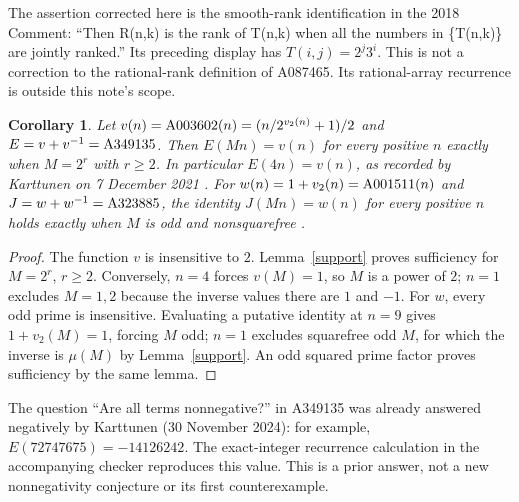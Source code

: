\documentclass[11pt]{article}
\newtheorem{corollary}[theorem]{Corollary}
\newcommand{\A}[1]{\textnormal{A#1}}
\begin{document}
The assertion corrected here is the smooth-rank identification in the
2018 Comment: ``Then R(n,k) is the rank of T(n,k) when all the numbers
in \{T(n,k)\} are jointly ranked.'' Its preceding display has
$T(i,j)=2^j3^i$. This is not a correction to the rational-rank definition of A087465.
Its rational-array recurrence is outside this note's scope.

\begin{corollary}\label{binary}
Let $v(n)=\A{003602}(n)=(n/2^{v_2(n)}+1)/2$ and
$E=v+v^{-1}=\A{349135}$. Then $E(Mn)=v(n)$ for every positive $n$
exactly when $M=2^r$ with $r\geq2$. In particular $E(4n)=v(n)$,
as recorded by Karttunen on 7 December 2021 \cite{binarysum}.
For $w(n)=1+v_2(n)=\A{001511}(n)$ and
$J=w+w^{-1}=\A{323885}$, the identity $J(Mn)=w(n)$ for every
positive $n$ holds exactly when $M$ is odd and nonsquarefree \cite{rulersum}.
\end{corollary}
\begin{proof}
The function $v$ is insensitive to $2$. Lemma~\ref{support} proves
sufficiency for $M=2^r$, $r\geq2$.
Conversely, $n=4$ forces $v(M)=1$, so $M$ is a power of $2$;
$n=1$ excludes $M=1,2$ because the inverse values there are $1$ and $-1$.
For $w$, every odd prime is insensitive. Evaluating a putative identity
at $n=9$ gives $1+v_2(M)=1$, forcing $M$ odd; $n=1$ excludes squarefree
odd $M$, for which the inverse is $\mu(M)$ by Lemma~\ref{support}.
An odd squared prime factor proves sufficiency by the same lemma.
\end{proof}

The question ``Are all terms nonnegative?'' in A349135 was
already answered negatively by Karttunen (30 November 2024): for example,
$E(72747675)=-14126242$. The exact-integer recurrence calculation in
the accompanying checker reproduces this value. This is a prior answer,
not a new nonnegativity conjecture or its first counterexample.
\end{document}
